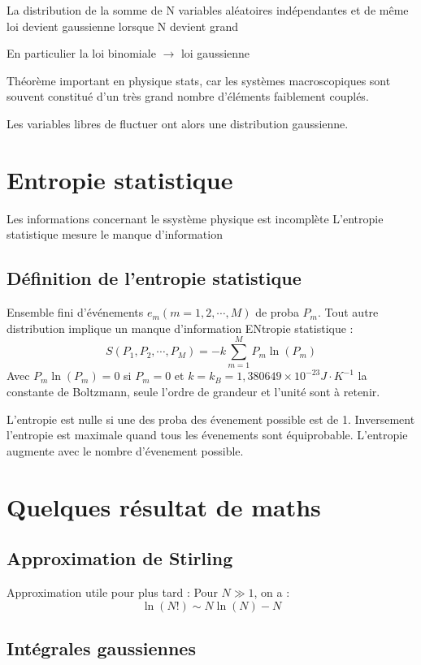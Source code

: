 \documentclass[12pt,a4paper]{report}
\begin{document}
La distribution de la somme de N variables aléatoires indépendantes et de même loi devient gaussienne lorsque N devient grand

En particulier la loi binomiale \(\rightarrow\) loi gaussienne

Théorème important en physique stats, car les systèmes macroscopiques sont souvent constitué d'un très grand nombre d'éléments faiblement couplés.

Les variables libres de fluctuer ont alors une distribution gaussienne.

\section{Entropie statistique}

Les informations concernant le ssystème physique est incomplète
L'entropie statistique mesure le manque d'information

\subsection{Définition de l'entropie statistique}

Ensemble fini d'événements \(e_m (m = 1,2, \cdots , M)\) de proba \(P_m\).
Tout autre distribution implique un manque d'information
ENtropie statistique :
\[
	S(P_1, P_2, \cdots, P_M) = -k \sum_{m=1}^M P_m \ln(P_m)
\]
Avec \(P_m \ln(P_m) = 0\) si \(P_m = 0\) et \(k = k_B = 1,380649 \times 10^{-23} J\cdot K^{-1}\) la constante de Boltzmann, seule l'ordre de grandeur et l'unité sont à retenir.

L'entropie est nulle si une des proba des évenement possible est de 1. Inversement l'entropie est maximale quand tous les évenements sont équiprobable. L'entropie augmente avec le nombre d'évenement possible.

\section{Quelques résultat de maths}

\subsection{Approximation de Stirling}

Approximation utile pour plus tard :
Pour \(N \gg 1\), on a :
\[
	\ln(N!) \sim N \ln(N) - N
\]

\subsection{Intégrales gaussiennes}
\end{document}
